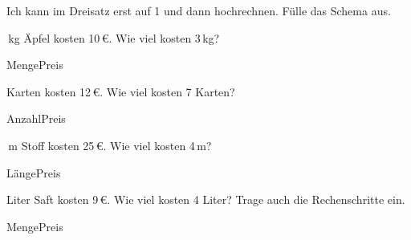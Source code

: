 \begin{aufgabe}{Ich kann im Dreisatz erst auf 1 und dann hochrechnen. Fülle das Schema aus.}
\par\noindent\begin{minipage}[t]{0.48\linewidth}\vspace{0pt}
\begin{teile}\,kg Äpfel kosten 10\,€. Wie viel kosten 3\,kg?\end{teile}
\begin{dreisatz}{Menge}{Preis}
\end{dreisatz}
\end{minipage}\hfill
\begin{minipage}[t]{0.48\linewidth}\vspace{0pt}
\begin{teile} Karten kosten 12\,€. Wie viel kosten 7 Karten?\end{teile}
\begin{dreisatz}{Anzahl}{Preis}
\end{dreisatz}
\end{minipage}\par\medskip
\noindent\begin{minipage}[t]{0.48\linewidth}\vspace{0pt}
\begin{teile}\,m Stoff kosten 25\,€. Wie viel kosten 4\,m?\end{teile}
\begin{dreisatz}{Länge}{Preis}
\end{dreisatz}
\end{minipage}\hfill
\begin{minipage}[t]{0.48\linewidth}\vspace{0pt}
\begin{teile} Liter Saft kosten 9\,€. Wie viel kosten 4 Liter? Trage auch die Rechenschritte ein.\end{teile}
\begin{dreisatz}{Menge}{Preis}
\dsp{\phantom{:0}}{\phantom{:0}}
\dsz{\dsleer}{\dsleer}
\dsp{\phantom{:0}}{\phantom{:0}}
\end{dreisatz}
\end{minipage}\par
\end{aufgabe}

